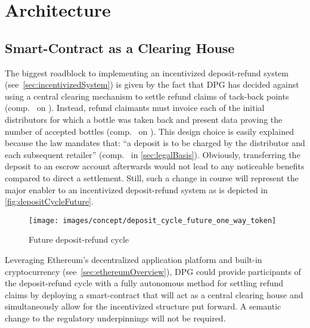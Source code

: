 	
\pagebreak

\section{Architecture}
\subsection{Smart-Contract as a Clearing House}
\label{sec:centralClearingHouse}
The biggest roadblock to implementing an incentivized deposit-refund system (see~\ref{sec:incentivizedSystem}) is given by the fact that \ac{DPG} has decided against using a central clearing mechanism to settle refund claims of tack-back points (comp.~ on ). Instead, refund claimants must invoice each of the initial distributors for which a bottle was taken back and present data proving the number of accepted bottles (comp.~ on ). This design choice is easily explained because the law mandates that: \enquote{a deposit is to be charged by the distributor and each subsequent retailer} (comp.~ in \ref{sec:legalBasis}). Obviously, transferring the deposit to an escrow account afterwards would not lead to any noticeable benefits compared to direct a settlement. Still, such a change in course will represent the major enabler to an incentivized deposit-refund system as is depicted in \autoref{fig:depositCycleFuture}.

\begin{figure}[hbt]
	  \texttt{[image: images/concept/deposit\_cycle\_future\_one\_way\_token]}
	  \caption[Future deposit-refund cycle]{Future deposit-refund cycle \footnotemark}
	  \label{fig:depositCycleFuture}
\end{figure}


\FloatBarrier

Leveraging Ethereum's decentralized application platform and built-in cryptocurrency (see~\ref{sec:ethereumOverview}), \ac{DPG} could provide participants of the deposit-refund cycle with a fully autonomous method for settling refund claims by deploying a smart-contract that will act as a central clearing house and simultaneously allow for the incentivized structure put forward. A semantic change to the regulatory underpinnings will not be required. 

